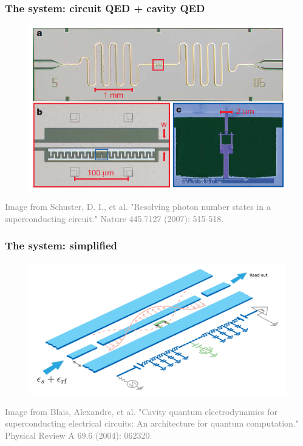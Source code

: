 \documentclass[xcolor=dvipsnames,hyperref={CJKbookmarks=true}]{beamer}
\begin{document}
\begin{frame}
\frametitle{The system: circuit QED + cavity QED}
\begin{figure}
\centering
\includegraphics[width=0.8\linewidth]{Circuit.png}
\end{figure}
\tiny{\textcolor{gray}{Image from Schuster, D. I., et al. "Resolving photon number states in a superconducting circuit." Nature 445.7127 (2007): 515-518.\cite{schuster2007resolving}}}
\end{frame}

\begin{frame}
\frametitle{The system: simplified}
\begin{figure}
\centering
\includegraphics[width=\linewidth]{cavity.png}
\end{figure}
\tiny{\textcolor{gray}{Image from Blais, Alexandre, et al. "Cavity quantum electrodynamics for superconducting electrical circuits: An architecture for quantum computation." Physical Review A 69.6 (2004): 062320.\cite{blais2004cavity}}}
\end{frame}
\end{document}
